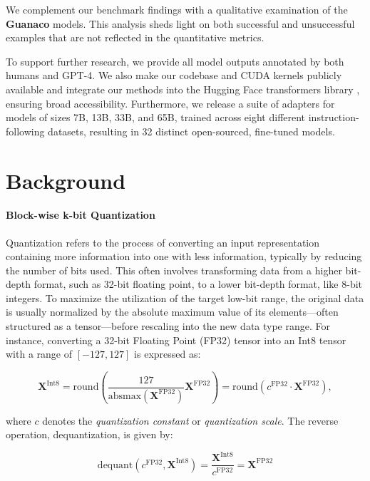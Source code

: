 We complement our benchmark findings with a qualitative examination of the \textbf{Guanaco} models. This analysis sheds light on both successful and unsuccessful examples that are not reflected in the quantitative metrics.

To support further research, we provide all model outputs annotated by both humans and GPT-4. We also make our codebase and CUDA kernels publicly available and integrate our methods into the Hugging Face transformers library \citep{wolf2019huggingface}, ensuring broad accessibility. Furthermore, we release a suite of adapters for models of sizes 7B, 13B, 33B, and 65B, trained across eight different instruction-following datasets, resulting in 32 distinct open-sourced, fine-tuned models.

\section{Background}
\paragraph{Block-wise k-bit Quantization} Quantization refers to the process of converting an input representation containing more information into one with less information, typically by reducing the number of bits used. This often involves transforming data from a higher bit-depth format, such as 32-bit floating point, to a lower bit-depth format, like 8-bit integers. To maximize the utilization of the target low-bit range, the original data is usually normalized by the absolute maximum value of its elements—often structured as a tensor—before rescaling into the new data type range. For instance, converting a 32-bit Floating Point (FP32) tensor into an Int8 tensor with a range of $[-127, 127]$ is expressed as:

\begin{equation}
    \mathbf{X}^{ \text{Int8}} = \text{round}\left( \frac{127}{{\text{absmax}}(\mathbf{X}^{{\text{FP32}}})}\mathbf{X}^{{\text{FP32}}} \right) = \text{round}(c^{\text{FP32}}\cdot \mathbf{X}^{{\text{FP32}}}),
\end{equation}

where $c$ denotes the {\em quantization constant} or {\em quantization scale}. The reverse operation, dequantization, is given by:

\begin{equation}
    \text{dequant}(c^{\text{FP32}}, \mathbf{X}^{\text{Int8}}) = \frac{\mathbf{X}^{\text{Int8}}}{c^{\text{FP32}}} = \mathbf{X}^{\text{FP32}}
\end{equation}

